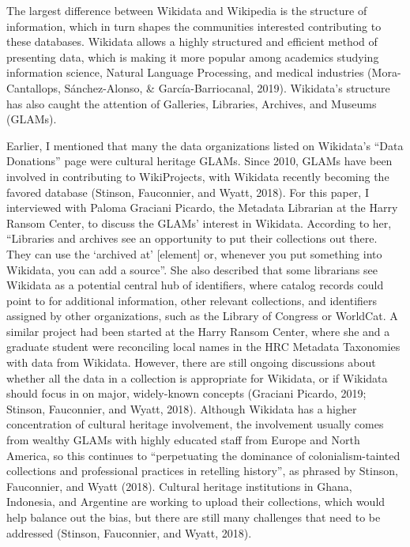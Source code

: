 \documentclass[]{article}
\begin{document}
The largest difference between Wikidata and Wikipedia is the structure
of information, which in turn shapes the communities interested
contributing to these databases. Wikidata allows a highly structured and
efficient method of presenting data, which is making it more popular
among academics studying information science, Natural Language
Processing, and medical industries (Mora-Cantallops, Sánchez-Alonso, \&
García-Barriocanal, 2019). Wikidata's structure has also caught the
attention of Galleries, Libraries, Archives, and Museums (GLAMs).

Earlier, I mentioned that many the data organizations listed on
Wikidata's ``Data Donations'' page were cultural heritage GLAMs. Since
2010, GLAMs have been involved in contributing to WikiProjects, with
Wikidata recently becoming the favored database (Stinson, Fauconnier,
and Wyatt, 2018). For this paper, I interviewed with Paloma Graciani
Picardo, the Metadata Librarian at the Harry Ransom Center, to discuss
the GLAMs' interest in Wikidata. According to her, ``Libraries and
archives see an opportunity to put their collections out there. They can
use the `archived at' {[}element{]} or, whenever you put something into
Wikidata, you can add a source''. She also described that some
librarians see Wikidata as a potential central hub of identifiers, where
catalog records could point to for additional information, other
relevant collections, and identifiers assigned by other organizations,
such as the Library of Congress or WorldCat. A similar project had been
started at the Harry Ransom Center, where she and a graduate student
were reconciling local names in the HRC Metadata Taxonomies with data
from Wikidata. However, there are still ongoing discussions about
whether all the data in a collection is appropriate for Wikidata, or if
Wikidata should focus in on major, widely-known concepts (Graciani
Picardo, 2019; Stinson, Fauconnier, and Wyatt, 2018). Although Wikidata
has a higher concentration of cultural heritage involvement, the
involvement usually comes from wealthy GLAMs with highly educated staff
from Europe and North America, so this continues to ``perpetuating the
dominance of colonialism-tainted collections and professional practices
in retelling history'', as phrased by Stinson, Fauconnier, and Wyatt
(2018). Cultural heritage institutions in Ghana, Indonesia, and
Argentine are working to upload their collections, which would help
balance out the bias, but there are still many challenges that need to
be addressed (Stinson, Fauconnier, and Wyatt, 2018).
\end{document}
